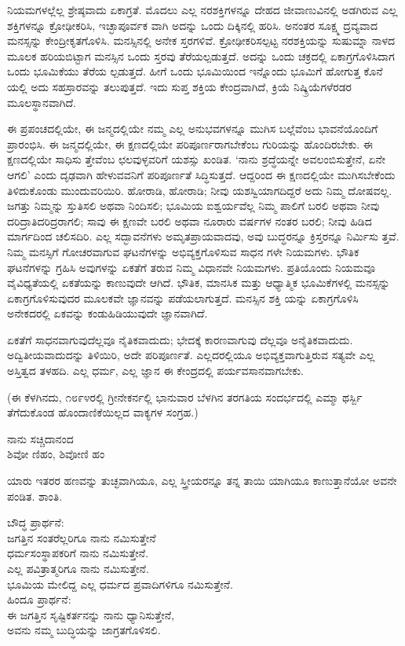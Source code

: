 ನಿಯಮಗಳಲ್ಲೆಲ್ಲ ಶ್ರೇಷ್ಠವಾದು ಏಕಾಗ್ರತೆ. ಮೊದಲು ಎಲ್ಲ ನರಶಕ್ತಿಗಳನ್ನೂ ದೇಹದ ಜೀವಾಣುವಿನಲ್ಲಿ ಅಡಗಿರುವ ಎಲ್ಲ ಶಕ್ತಿಗಳನ್ನೂ ಕ್ರೋಢೀಕರಿಸಿ, ಇಚ್ಛಾಪೂರ್ವಕ ವಾಗಿ ಅದನ್ನು ಒಂದು ದಿಕ್ಕಿನಲ್ಲಿ ಹರಿಸಿ. ಅನಂತರ ಸೂಕ್ಷ್ಮ ದ್ರವ್ಯವಾದ ಮನಸ್ಸನ್ನು ಕೇಂದ್ರೀಕೃತಗೊಳಿಸಿ. ಮನಸ್ಸಿನಲ್ಲಿ ಅನೇಕ ಸ್ತರಗಳಿವೆ. ಕ್ರೋಢೀಕರಿಸಲ್ಪಟ್ಟ ನರಶಕ್ತಿಯನ್ನು ಸುಷುಮ್ನಾ ನಾಳದ ಮೂಲಕ ಹರಿಯಬಿಟ್ಟಾಗ ಮನಸ್ಸಿನ ಒಂದು ಸ್ತರವು ತೆರೆಯಲ್ಪಡುತ್ತದೆ. ಅದನ್ನು ಒಂದು ಚಕ್ರದಲ್ಲಿ ಏಕಾಗ್ರಗೊಳಿಸಿದಾಗ ಒಂದು ಭೂಮಿಕೆಯು ತೆರೆಯ ಲ್ಪಡುತ್ತದೆ. ಹೀಗೆ ಒಂದು ಭೂಮಿಯಿಂದ ಇನ್ನೊಂದು ಭೂಮಿಗೆ ಹೋಗುತ್ತ ಕೊನೆ ಯಲ್ಲಿ ಅದು ಸಹಸ್ರಾರವನ್ನು ತಲುಪುತ್ತದೆ. ಇದು ಸುಪ್ತ ಶಕ್ತಿಯ ಕೇಂದ್ರವಾಗಿದೆ, ಕ್ರಿಯೆ ನಿಷ್ಕ್ರಿಯೆಗಳೆರಡರ ಮೂಲಸ್ಥಾನವಾಗಿದೆ.

ಈ ಪ್ರಪಂಚದಲ್ಲಿಯೇ, ಈ ಜನ್ಮದಲ್ಲಿಯೇ ನಮ್ಮ ಎಲ್ಲ ಅನುಭವಗಳನ್ನೂ ಮುಗಿಸ ಬಲ್ಲೆವೆಂಬ ಭಾವನೆಯೊಂದಿಗೆ ಪ್ರಾರಂಭಿಸಿ. ಈ ಜನ್ಮದಲ್ಲಿಯೇ, ಈ ಕ್ಷಣದಲ್ಲಿಯೇ ಪರಿಪೂರ್ಣರಾಗಬೇಕೆಂಬ ಗುರಿಯನ್ನು ಹೊಂದಿರಬೇಕು. ಈ ಕ್ಷಣದಲ್ಲಿಯೇ ಸಾಧಿಸು ತ್ತೇವೆಂಬ ಛಲವುಳ್ಳವರಿಗೆ ಯಶಸ್ಸು ಖಂಡಿತ. ‘ನಾನು ಶ್ರದ್ಧೆಯನ್ನೇ ಅವಲಂಬಿಸುತ್ತೇನೆ, ಏನೇ ಆಗಲಿ’ ಎಂದು ದೃಢವಾಗಿ ಹೇಳುವವನಿಗೆ ಪರಿಪೂರ್ಣತೆ ಸಿದ್ಧಿಸುತ್ತದೆ. ಆದ್ದರಿಂದ ಈ ಕ್ಷಣದಲ್ಲಿಯೇ ಮುಗಿಸಬೇಕೆಂದು ತಿಳಿದುಕೊಂಡು ಮುಂದುವರಿಯಿರಿ. ಹೋರಾಡಿ, ಹೋರಾಡಿ; ನೀವು ಯಶಸ್ವಿಯಾಗದಿದ್ದರೆ ಅದು ನಿಮ್ಮ ದೋಷವಲ್ಲ. ಜಗತ್ತು ನಿಮ್ಮನ್ನು ಸ್ತುತಿಸಲಿ ಅಥವಾ ನಿಂದಿಸಲಿ; ಭೂಮಿಯ ಐಶ್ವರ್ಯವೆಲ್ಲ ನಿಮ್ಮ ಪಾಲಿಗೆ ಬರಲಿ ಅಥವಾ ನೀವು ದರಿದ್ರಾತಿದರಿದ್ರರಾಗಲಿ; ಸಾವು ಈ ಕ್ಷಣವೇ ಬರಲಿ ಅಥವಾ ನೂರಾರು ವರ್ಷಗಳ ನಂತರ ಬರಲಿ; ನೀವು ಹಿಡಿದ ಮಾರ್ಗದಿಂದ ಚಲಿಸದಿರಿ. ಎಲ್ಲ ಸದ್ಭಾವನೆಗಳು ಅಮೃತಪ್ರಾಯವಾದವು, ಅವು ಬುದ್ಧರನ್ನೂ ಕ್ರಿಸ್ತರನ್ನೂ ನಿರ್ಮಿಸು ತ್ತವೆ. ನಿಮ್ಮ ಮನಸ್ಸಿಗೆ ಗೋಚರವಾಗುವ ಘಟನೆಗಳನ್ನು ಅಭಿವ್ಯಕ್ತಗೊಳಿಸುವ ಸಾಧನ ಗಳೇ ನಿಯಮಗಳು. ಭೌತಿಕ ಘಟನೆಗಳನ್ನು ಗ್ರಹಿಸಿ ಅವುಗಳನ್ನು ಏಕತೆಗೆ ತರುವ ನಿಮ್ಮ ವಿಧಾನವೇ ನಿಯಮಗಳು. ಪ್ರತಿಯೊಂದು ನಿಯಮವೂ ವೈವಿಧ್ಯತೆಯಲ್ಲಿ ಏಕತೆಯನ್ನು ಕಾಣುವುದೇ ಆಗಿದೆ. ಭೌತಿಕ, ಮಾನಸಿಕ ಮತ್ತು ಆಧ್ಯಾತ್ಮಿಕ ಭೂಮಿಕೆಗಳಲ್ಲಿ ಮನಸ್ಸನ್ನು ಏಕಾಗ್ರಗೊಳಿಸುವುದರ ಮೂಲಕವೇ ಜ್ಞಾನವನ್ನು ಪಡೆಯಲಾಗುತ್ತದೆ. ಮನಸ್ಸಿನ ಶಕ್ತಿ ಯನ್ನು ಏಕಾಗ್ರಗೊಳಿಸಿ ಅನೇಕದರಲ್ಲಿ ಏಕವನ್ನು ಕಂಡುಹಿಡಿಯುವುದೇ ಜ್ಞಾನವಾಗಿದೆ.

ಏಕತೆಗೆ ಸಾಧನವಾಗುವುದೆಲ್ಲವೂ ನೈತಿಕವಾದುದು; ಭೇದಕ್ಕೆ ಕಾರಣವಾಗುವು ದೆಲ್ಲವೂ ಅನೈತಿಕವಾದುದು. ಅದ್ವಿತೀಯವಾದುದನ್ನು ತಿಳಿಯಿರಿ, ಅದೇ ಪರಿಪೂರ್ಣತೆ. ಎಲ್ಲದರಲ್ಲಿಯೂ ಅಭಿವ್ಯಕ್ತವಾಗುತ್ತಿರುವ ಸತ್ಯವೇ ಎಲ್ಲ ಅಸ್ತಿತ್ವದ ತಳಹದಿ. ಎಲ್ಲ ಧರ್ಮ, ಎಲ್ಲ ಜ್ಞಾನ ಈ ಕೇಂದ್ರದಲ್ಲಿ ಪರ್ಯವಸಾನವಾಗಬೇಕು.

(ಈ ಕೆಳಗಿನದು, ೧೮೯೪ರಲ್ಲಿ ಗ್ರೀನೇಕರ್ನಲ್ಲಿ ಭಾನುವಾರ ಬೆಳಗಿನ ತರಗತಿಯ ಸಂದರ್ಭದಲ್ಲಿ ಎಮ್ಮಾ ಥರ್ಸ್ಬಿ ತೆಗೆದುಕೊಂಡ ಹೊಂದಾಣಿಕೆಯಿಲ್ಲದ ವಾಕ್ಯಗಳ ಸಂಗ್ರಹ.)

\begin{myquote}
ನಾನು ಸಚ್ಚಿದಾನಂದ\\ಶಿವೋ ಣಿಹಂ, ಶಿವೋಣಿ ಹಂ
\end{myquote}

ಯಾರು ಇತರರ ಹಣವನ್ನು ತುಚ್ಛವಾಗಿಯೂ, ಎಲ್ಲ ಸ್ತ್ರೀಯರನ್ನೂ ತನ್ನ ತಾಯಿ ಯಾಗಿಯೂ ಕಾಣುತ್ತಾನೆಯೋ ಅವನೇ ಪಂಡಿತ. ಶಾಂತಿ.

\begin{myquote}
ಬೌದ್ಧ ಪ್ರಾರ್ಥನೆ:\\ಜಗತ್ತಿನ ಸಂತರೆಲ್ಲರಿಗೂ ನಾನು ನಮಿಸುತ್ತೇನೆ\\ಧರ್ಮಸಂಸ್ಥಾಪಕರಿಗೆ ನಾನು ನಮಿಸುತ್ತೇನೆ.\\ಎಲ್ಲ ಪವಿತ್ರಾತ್ಮರಿಗೂ ನಾನು ನಮಿಸುತ್ತೇನೆ.\\ಭೂಮಿಯ ಮೇಲಿದ್ದ ಎಲ್ಲ ಧರ್ಮದ ಪ್ರವಾದಿಗಳಿಗೂ ನಮಿಸುತ್ತೇನೆ.\\ಹಿಂದೂ ಪ್ರಾರ್ಥನೆ:\\ಈ ಜಗತ್ತಿನ ಸೃಷ್ಟಿಕರ್ತನನ್ನು ನಾನು ಧ್ಯಾನಿಸುತ್ತೇನೆ,\\ಅವನು ನಮ್ಮ ಬುದ್ಧಿಯನ್ನು ಜಾಗ್ರತಗೊಳಿಸಲಿ.
\end{myquote}

